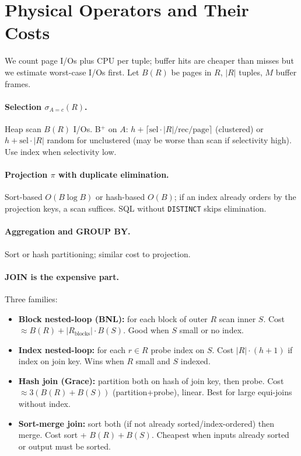 \section{Physical Operators and Their Costs}
\label{sec:physical}

We count page I/Os plus CPU per tuple; buffer hits are cheaper than misses but we estimate worst-case I/Os first. Let $B(R)$ be pages in $R$, $|R|$ tuples, $M$ buffer frames.

\paragraph{Selection $\sigma_{A=c}(R)$.} Heap scan $B(R)$ I/Os. B$^+$ on $A$: $h + \lceil\text{sel}\cdot|R|/ \text{rec/page}\rceil$ (clustered) or $h + \text{sel}\cdot|R|$ random for unclustered (may be worse than scan if selectivity high). Use index when selectivity low.

\paragraph{Projection $\pi$ with duplicate elimination.} Sort-based $O(B\log B)$ or hash-based $O(B)$; if an index already orders by the projection keys, a scan suffices. SQL without \texttt{DISTINCT} skips elimination.

\paragraph{Aggregation and GROUP BY.} Sort or hash partitioning; similar cost to projection.

\paragraph{JOIN is the expensive part.} Three families:

\begin{itemize}
    \item \textbf{Block nested-loop (BNL):} for each block of outer $R$ scan inner $S$. Cost $\approx B(R)+|R_{\text{blocks}}|\cdot B(S)$. Good when $S$ small or no index.
    \item \textbf{Index nested-loop:} for each $r\in R$ probe index on $S$. Cost $|R| \cdot (h+1)$ if index on join key. Wins when $R$ small and $S$ indexed.
    \item \textbf{Hash join (Grace):} partition both on hash of join key, then probe. Cost $\approx 3(B(R)+B(S))$ (partition+probe), linear. Best for large equi-joins without index.
    \item \textbf{Sort-merge join:} sort both (if not already sorted/index-ordered) then merge. Cost sort + $B(R)+B(S)$. Cheapest when inputs already sorted or output must be sorted.
\end{itemize}

